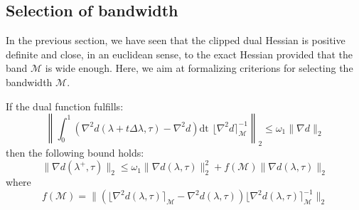 \subsection{Selection of bandwidth}

In the previous section, we have seen that the clipped dual Hessian is positive definite and close, in an euclidean sense, to the exact Hessian provided that the band $\mathcal{M}$ is wide enough. Here, we aim at formalizing criterions for selecting the bandwidth $\mathcal{M}$.

\begin{theorem} If the dual function fulfills:
\begin{equation} \label{e:ConditionHessian}
\left\| \int_0^1 ( \nabla^2 d(\lambda + t \Delta \lambda, \tau) - \nabla^2 d ) \text{dt } \lfloor \nabla^2 d \rceil_{\mathcal{M}}^{-1} \right\|_2 \leq \omega_1 \| \nabla d \|_2
\end{equation}
then the following bound holds:
\begin{equation} \label{e:Convergence}
\| \nabla d(\lambda^+,\tau) \|_2 \leq \omega_1 \| \nabla d(\lambda, \tau) \|_2^2 + f(\mathcal{M}) \| \nabla d(\lambda, \tau) \|_2
\end{equation}
where
\begin{equation}
f(\mathcal{M}) = \| (\lfloor \nabla^2 d(\lambda, \tau) \rceil_{\mathcal{M}} - \nabla^2 d(\lambda,\tau) ) \lfloor \nabla^2 d(\lambda, \tau) \rceil_{\mathcal{M}}^{-1} \|_2
\end{equation}
\end{theorem}
